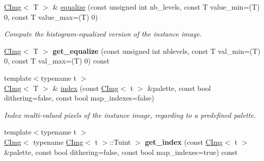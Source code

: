 \begin{DoxyCompactItemize}
\item 
\hyperlink{structcimg__library_1_1CImg}{CImg}$<$ T $>$ \& \hyperlink{structcimg__library_1_1CImg_a62191853dd65b6f5cbc43e7a63a74832}{equalize} (const unsigned int nb\_\-levels, const T value\_\-min=(T) 0, const T value\_\-max=(T) 0)
\begin{DoxyCompactList}\small\item\em Compute the histogram-\/equalized version of the instance image. \item\end{DoxyCompactList}\item 
\hypertarget{structcimg__library_1_1CImg_a6176dba8dc6191a96eaebedb6fc7805e}{
\hyperlink{structcimg__library_1_1CImg}{CImg}$<$ T $>$ {\bfseries get\_\-equalize} (const unsigned int nblevels, const T val\_\-min=(T) 0, const T val\_\-max=(T) 0) const }
\label{structcimg__library_1_1CImg_a6176dba8dc6191a96eaebedb6fc7805e}

\item 
{\footnotesize template$<$typename t $>$ }\\\hyperlink{structcimg__library_1_1CImg}{CImg}$<$ T $>$ \& \hyperlink{structcimg__library_1_1CImg_a06115492b8d5f2e6af399c84eb07c1ee}{index} (const \hyperlink{structcimg__library_1_1CImg}{CImg}$<$ t $>$ \&palette, const bool dithering=false, const bool map\_\-indexes=false)
\begin{DoxyCompactList}\small\item\em Index multi-\/valued pixels of the instance image, regarding to a predefined palette. \item\end{DoxyCompactList}\item 
\hypertarget{structcimg__library_1_1CImg_a0f89ff9442412e2228cab81f7d97a4a1}{
{\footnotesize template$<$typename t $>$ }\\\hyperlink{structcimg__library_1_1CImg}{CImg}$<$ typename \hyperlink{structcimg__library_1_1CImg}{CImg}$<$ t $>$::Tuint $>$ {\bfseries get\_\-index} (const \hyperlink{structcimg__library_1_1CImg}{CImg}$<$ t $>$ \&palette, const bool dithering=false, const bool map\_\-indexes=true) const }
\label{structcimg__library_1_1CImg_a0f89ff9442412e2228cab81f7d97a4a1}


\end{DoxyCompactItemize}
